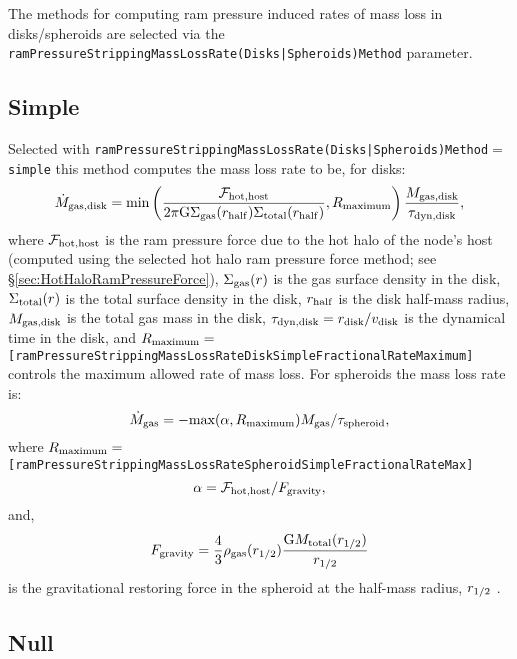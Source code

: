 The methods for computing ram pressure induced rates of mass loss in disks/spheroids are selected via the {\tt ramPressureStrippingMassLossRate(Disks|Spheroids)Method} parameter.

\subsection{Simple}

Selected with {\tt ramPressureStrippingMassLossRate(Disks|Spheroids)Method}$=${\tt simple} this method computes the mass loss rate to be, for disks:
\begin{equation}
 \dot{M}_{\rm gas, disk} = \hbox{min}\left({\mathcal{F}_{\rm hot, host} \over 2 \pi {\rm G} \Sigma_{\rm gas}(r_{\rm half}) \Sigma_{\rm total}(r_{\rm half})}, R_{\rm maximum}\right) {M_{\rm gas, disk} \over \tau_{\rm dyn, disk}},
\end{equation}
where $\mathcal{F}_{\rm hot, host}$ is the ram pressure force due to the hot halo of the node's host (computed using the selected hot halo ram pressure force method; see \S\ref{sec:HotHaloRamPressureForce}), $\Sigma_{\rm gas}(r)$ is the gas surface density in the disk, $\Sigma_{\rm total}(r)$ is the total surface density in the disk, $r_{\rm half}$ is the disk half-mass radius, $M_{\rm gas, disk}$ is the total gas mass in the disk, $\tau_{\rm dyn, disk} = r_{\rm disk}/v_{\rm disk}$ is the dynamical time in the disk, and $R_{\rm maximum}=${\tt [ramPressureStrippingMassLossRateDiskSimpleFractionalRateMaximum]} controls the maximum allowed rate of mass loss. For spheroids the mass loss rate is:
\begin{equation}
\dot{M}_{\rm gas} = -\hbox{max}(\alpha,R_{\rm maximum}) M_{\rm gas}/\tau_{\rm spheroid},
\end{equation}
where $R_{\rm maximum}=${\tt [ramPressureStrippingMassLossRateSpheroidSimpleFractionalRateMax]}
\begin{equation}
\alpha = \mathcal{F}_{\rm hot,host}/F_{\rm gravity},
\end{equation}
and,
\begin{equation}
F_{\rm gravity} = {4\over 3} \rho_{\rm gas}(r_{1/2}) {{\rm G} M_{\rm total}(r_{1/2})\over r_{1/2}}
\end{equation}
is the gravitational restoring force in the spheroid at the half-mass radius, $r_{\rm 1/2}$ \citep{takeda_ram_1984}.


\subsection{Null}

